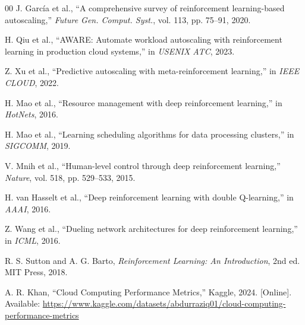 \documentclass[conference]{IEEEtran}
\begin{document}
\begin{thebibliography}{00}
 J. García et al., ``A comprehensive survey of reinforcement learning-based autoscaling,'' \textit{Future Gen. Comput. Syst.}, vol. 113, pp. 75--91, 2020.

 H. Qiu et al., ``AWARE: Automate workload autoscaling with reinforcement learning in production cloud systems,'' in \textit{USENIX ATC}, 2023.

 Z. Xu et al., ``Predictive autoscaling with meta-reinforcement learning,'' in \textit{IEEE CLOUD}, 2022.

 H. Mao et al., ``Resource management with deep reinforcement learning,'' in \textit{HotNets}, 2016.

 H. Mao et al., ``Learning scheduling algorithms for data processing clusters,'' in \textit{SIGCOMM}, 2019.

 V. Mnih et al., ``Human-level control through deep reinforcement learning,'' \textit{Nature}, vol. 518, pp. 529--533, 2015.

 H. van Hasselt et al., ``Deep reinforcement learning with double Q-learning,'' in \textit{AAAI}, 2016.

 Z. Wang et al., ``Dueling network architectures for deep reinforcement learning,'' in \textit{ICML}, 2016.

 R. S. Sutton and A. G. Barto, \textit{Reinforcement Learning: An Introduction}, 2nd ed. MIT Press, 2018.

 A. R. Khan, ``Cloud Computing Performance Metrics,'' Kaggle, 2024. [Online]. Available: \url{https://www.kaggle.com/datasets/abdurraziq01/cloud-computing-performance-metrics}
\end{thebibliography}
\end{document}
